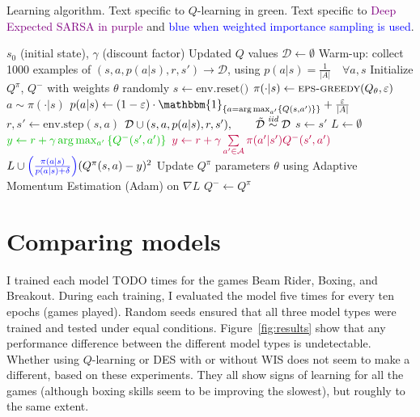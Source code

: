 \documentclass{article}
\begin{document}
\begin{algorithm}
    \caption{Learning algorithm. Text specific to \textcolor{dgreen}{\(Q\)-learning in green}. Text specific to \textcolor{purple}{Deep Expected SARSA in purple} and \textcolor{blue}{blue when weighted importance sampling is used}.}
    \begin{algorithmic}
        \Require $s_0$ (initial state), $\gamma$ (discount factor)
        \Ensure Updated $Q$ values
        \State \(\mathcal{D} \gets \emptyset\)
        \State Warm-up: collect 1000 examples of $(s, a, p(a|s), r, s') \rightarrow \mathcal{D}$, using $p(a|s) = \frac{1}{|A|} \quad \forall a, s$
        \State Initialize $Q^\pi$, $Q^-$ with weights \(\theta\) randomly
            \State $s \gets \text{env.reset()}$
                \State $\pi(\cdot | s) \gets \Call{eps-greedy}{Q_\theta, \eps}$
                \State $a \sim \pi(\cdot|s)$
                \State $p(a|s) \gets (1 - \eps) \cdot \mathbbm{1}_{\set{a = \arg\max_{a'}\set{Q(s,a')}}} + \frac{\eps}{|A|}$
                \State $r, s' \gets \text{env.step}(s, a)$
                \State $\mathcal{D} \cup (s, a, p(a|s), r, s'),\qquad \tilde{\mathcal{D}} \overset{\textit{iid}}{\sim}\mathcal{D}$
                \State $s \gets s'$
                \State $L \gets \emptyset$
                    \State $\textcolor{dgreen}{y \gets r + \gamma \arg\max_{a'}\set{Q^-(s',a')}}$
                    \State $\textcolor{purple}{y \gets r + \gamma \sum\limits_{a' \in \mathcal{A}} \pi(a' | s') Q^-(s', a')}$
                    \State $L \cup \textcolor{blue}{\left( \frac{\pi(a|s)}{p(a|s) + \delta} \right)} (Q^\pi(s, a) - y)^2$ %
                    \EndFor
                \State Update $Q^\pi$ parameters \(\theta\) using Adaptive Momentum Estimation (Adam) on \(\nabla L\)
                    \State $Q^- \gets Q^\pi$
                \EndIf
            \EndWhile
        \EndFor
    \end{algorithmic}
\end{algorithm}

\section{Comparing models}
I trained each model TODO times for the games Beam Rider, Boxing, and Breakout. During each training, I evaluated the model five times for every ten epochs (games played). Random seeds ensured that all three model types were trained and tested under equal conditions. Figure~\ref{fig:results} show that any performance difference between the different model types is undetectable. Whether using \(Q\)-learning or DES with or without WIS does not seem to make a different, based on these experiments. They all show signs of learning for all the games (although boxing skills seem to be improving the slowest), but roughly to the same extent.
\end{document}
